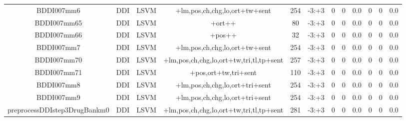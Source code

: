 \documentclass[a4paper]{article}
\begin{document}
\begin{landscape}
\begin{center}
\begin{tabular}{ |c|c|c|c|c|c|c|c|c|c|c|c|}
 
 	
 	\small{ BDDI007mm6 } & \small{ DDI} & \small{  LSVM }  & +lm,pos,ch,chg,lo,ort+tw+sent  &  254 &  \small{  -3:+3 }  &  0 & 0 & 0.0  &  0 & 0 & 0.0 \\
 	

 
 	
 	\small{ BDDI007mm65 } & \small{ DDI} & \small{  LSVM }  & +ort++  &  80 &  \small{  -3:+3 }  &  0 & 0 & 0.0  &  0 & 0 & 0.0 \\
 	

 
 	
 	\small{ BDDI007mm66 } & \small{ DDI} & \small{  LSVM }  & +pos++  &  32 &  \small{  -3:+3 }  &  0 & 0 & 0.0  &  0 & 0 & 0.0 \\
 	

 
 	
 	\small{ BDDI007mm7 } & \small{ DDI} & \small{  LSVM }  & +lm,pos,ch,chg,lo,ort+tw+sent  &  254 &  \small{  -3:+3 }  &  0 & 0 & 0.0  &  0 & 0 & 0.0 \\
 	

 
 	
 	\small{ BDDI007mm70 } & \small{ DDI} & \small{  LSVM }  & +lm,pos,ch,chg,lo,ort+tw,tri,tl,tp+sent  &  257 &  \small{  -3:+3 }  &  0 & 0 & 0.0  &  0 & 0 & 0.0 \\
 	

 
 	
 	\small{ BDDI007mm71 } & \small{ DDI} & \small{  LSVM }  & +pos,ort+tw,tri+sent  &  110 &  \small{  -3:+3 }  &  0 & 0 & 0.0  &  0 & 0 & 0.0 \\
 	

 
 	
 	\small{ BDDI007mm8 } & \small{ DDI} & \small{  LSVM }  & +lm,pos,ch,chg,lo,ort+tri+sent  &  254 &  \small{  -3:+3 }  &  0 & 0 & 0.0  &  0 & 0 & 0.0 \\
 	

 
 	
 	\small{ BDDI007mm9 } & \small{ DDI} & \small{  LSVM }  & +lm,pos,ch,chg,lo,ort+tri+sent  &  254 &  \small{  -3:+3 }  &  0 & 0 & 0.0  &  0 & 0 & 0.0 \\
 	

 
 	
 	\small{ preprocessDDIstep3DrugBankm0 } & \small{ DDI} & \small{  LSVM }  & +lm,pos,ch,chg,lo,ort+tw,tri,tl,tp+sent  &  281 &  \small{  -3:+3 }  &  0 & 0 & 0.0  &  0 & 0 & 0.0 \\
 	

 
 \hline
\end{tabular}
\end{center}

\end{landscape}
\end{document}
